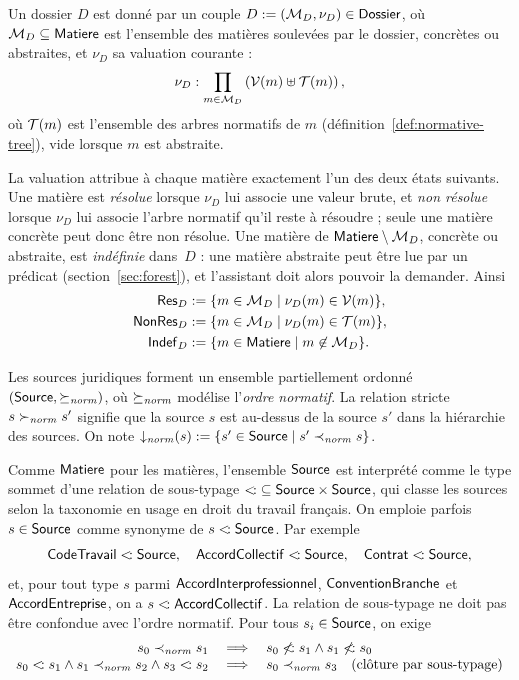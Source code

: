 \documentclass[review]{jflart}
\begin{document}
\begin{defi}[Dossier]\label{def:dossier}
Un dossier \(D\) est donné par un couple
\(D:=(\mathcal M_D,\nu_D)\in\mathsf{Dossier}\), où \(\mathcal M_D\subseteq\mathsf{Matiere}\)
est l'ensemble des matières soulevées par le dossier, concrètes ou abstraites,
et \(\nu_D\) sa valuation courante :
\[
\nu_D:\prod_{m\in\mathcal{M}_D}\left(\mathcal{V}(m)\uplus\mathcal{T}(m)\right),
\]
où \(\mathcal{T}(m)\) est l'ensemble des arbres normatifs de \(m\)
(définition~\ref{def:normative-tree}), vide lorsque \(m\) est abstraite.
\end{defi}

La valuation attribue à chaque matière exactement l'un des deux états suivants.
Une matière est \emph{résolue} lorsque \(\nu_D\) lui associe une valeur brute,
et \emph{non résolue} lorsque \(\nu_D\) lui associe l'arbre normatif qu'il
reste à résoudre ; seule une matière concrète peut donc être non résolue. Une
matière de \(\mathsf{Matiere}\setminus\mathcal{M}_D\), concrète ou abstraite, est
\emph{indéfinie} dans~\(D\) : une matière abstraite peut être lue par un
prédicat (section~\ref{sec:forest}), et l'assistant doit alors pouvoir la
demander. Ainsi
\[
\begin{aligned}
\mathsf{Res}_D&:=\{m\in\mathcal M_D\mid \nu_D(m)\in\mathcal{V}(m)\},\\
\mathsf{NonRes}_D&:=\{m\in\mathcal M_D\mid \nu_D(m)\in\mathcal{T}(m)\},\\
\mathsf{Indef}_D&:= \{m\in\mathsf{Matiere} \mid m\not\in \mathcal{M}_D\}.
\end{aligned}
\]

\begin{defi}\label{def:source-order}
Les sources juridiques forment un ensemble partiellement ordonné
\((\mathsf{Source},\succeq_{\mathit{norm}})\), où \(\succeq_{\mathit{norm}}\) modélise l'\emph{ordre normatif}. La
relation stricte \(s\succ_{\mathit{norm}} s'\) signifie que la source \(s\) est au-dessus de
la source \(s'\) dans la hiérarchie des sources. On note
\(\mathop{\downarrow_{\mathit{norm}}}(s):=\{s'\in\mathsf{Source}\mid s'\prec_{\mathit{norm}} s\}\).
\end{defi}

Comme \(\mathsf{Matiere}\) pour les matières, l'ensemble \(\mathsf{Source}\) est interprété
comme le type sommet d'une relation de sous-typage
\({\mathrel{<\!:}}\subseteq\mathsf{Source}\times\mathsf{Source}\), qui classe les sources
selon la taxonomie en usage en droit du travail français. On emploie parfois
\(s\in\mathsf{Source}\) comme synonyme de \(s\mathrel{<\!:}\mathsf{Source}\). Par exemple
\[
\mathsf{CodeTravail}\mathrel{<\!:}\mathsf{Source},\quad
\mathsf{AccordCollectif}\mathrel{<\!:}\mathsf{Source},\quad
\mathsf{Contrat}\mathrel{<\!:}\mathsf{Source},
\]
et, pour tout type \(s\) parmi \(\mathsf{AccordInterprofessionnel}\), \(\mathsf{ConventionBranche}\) et
\(\mathsf{AccordEntreprise}\), on a \(s\mathrel{<\!:}\mathsf{AccordCollectif}\). La relation de sous-typage ne doit pas être
confondue avec l'ordre normatif. Pour tous \(s_i\in\mathsf{Source}\), on exige
\[
\begin{array}{rll}
s_0\prec_{\mathit{norm}} s_1&\implies& {s_0 \not\mathrel{<\!:} s_1} \wedge {s_1\not\mathrel{<\!:}s_0}\\
{s_0\mathrel{<\!:} s_1}\wedge {s_1\prec_{\mathit{norm}}s_2}\wedge {s_3\mathrel{<\!:}s_2}& \implies &s_0\prec_{\mathit{norm}} s_3\quad \text{(clôture par sous-typage)}
\end{array}
\]
\end{document}
